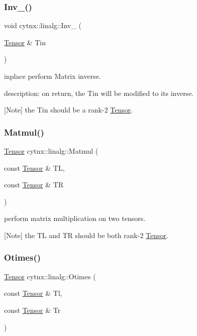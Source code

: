 \subsubsection{\texorpdfstring{Inv\+\_\+()}{Inv\_()}}
{\footnotesize\ttfamily void cytnx\+::linalg\+::\+Inv\+\_\+ (\begin{DoxyParamCaption}\item[{\hyperlink{classcytnx_1_1Tensor}{Tensor} \&}]{Tin }\end{DoxyParamCaption})}



inplace perform Matrix inverse. 

description\+: on return, the Tin will be modified to it\textquotesingle{}s inverse.

\mbox{[}Note\mbox{]} the Tin should be a rank-\/2 \hyperlink{classcytnx_1_1Tensor}{Tensor}. \mbox{\label{namespacecytnx_1_1linalg_a53feb441b4b1bd263714ed33e093728f}} 
\subsubsection{\texorpdfstring{Matmul()}{Matmul()}}
{\footnotesize\ttfamily \hyperlink{classcytnx_1_1Tensor}{Tensor} cytnx\+::linalg\+::\+Matmul (\begin{DoxyParamCaption}\item[{const \hyperlink{classcytnx_1_1Tensor}{Tensor} \&}]{TL,  }\item[{const \hyperlink{classcytnx_1_1Tensor}{Tensor} \&}]{TR }\end{DoxyParamCaption})}



perform matrix multiplication on two tensors. 

\mbox{[}Note\mbox{]} the TL and TR should be both rank-\/2 \hyperlink{classcytnx_1_1Tensor}{Tensor}. \mbox{\label{namespacecytnx_1_1linalg_ac76f4b5f153cdc817de5d33240046e52}} 
\subsubsection{\texorpdfstring{Otimes()}{Otimes()}}
{\footnotesize\ttfamily \hyperlink{classcytnx_1_1Tensor}{Tensor} cytnx\+::linalg\+::\+Otimes (\begin{DoxyParamCaption}\item[{const \hyperlink{classcytnx_1_1Tensor}{Tensor} \&}]{Tl,  }\item[{const \hyperlink{classcytnx_1_1Tensor}{Tensor} \&}]{Tr }\end{DoxyParamCaption})}



